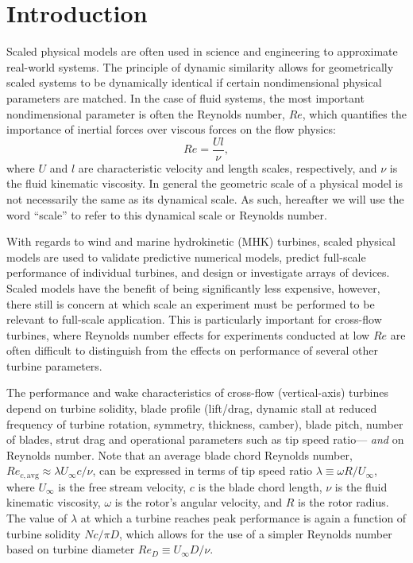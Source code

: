 \documentclass[energies,article,accept,moreauthors,pdftex,12pt,a4paper]{mdpi}
\begin{document}
\linenumbers


\section{Introduction}

Scaled physical models are often used in science and engineering to approximate
real-world systems. The principle of dynamic similarity allows for geometrically
scaled systems to be dynamically identical if certain nondimensional
physical parameters are matched. In the case of fluid systems, the most
important nondimensional parameter is often the Reynolds number, $Re$, which
quantifies the importance of inertial forces over viscous forces on the flow
physics:
\begin{equation}
    Re = \frac{Ul}{\nu},
    \label{eq:Re}
\end{equation}
where $U$ and $l$ are characteristic velocity and length scales, respectively,
and $\nu$ is the fluid kinematic viscosity. In general the geometric scale of a
physical model is not necessarily the same as its dynamical scale. As such,
hereafter we will use the word ``scale'' to refer to this dynamical scale or
Reynolds number.

With regards to wind and marine hydrokinetic (MHK) turbines, scaled physical
models are used to validate predictive numerical models, predict full-scale
performance of individual turbines, and design or investigate arrays of devices.
Scaled models have the benefit of being significantly less expensive, however,
there still is concern at which scale an experiment must be performed to be
relevant to full-scale application. This is particularly important for
cross-flow turbines, where Reynolds number effects for experiments conducted at
low $Re$ are often difficult to distinguish from the effects on performance of
several other turbine parameters.

The performance and wake characteristics of cross-flow (vertical-axis) turbines
depend on turbine solidity, blade profile (lift/drag, dynamic stall at reduced
frequency of turbine rotation, symmetry, thickness, camber), blade pitch, number
of blades, strut drag and operational parameters such as tip speed ratio---{\em
    and} on Reynolds number. Note that an average blade chord Reynolds number,
$Re_{c,\mathrm{avg}} \approx \lambda U_\infty c/ \nu$, can be expressed in terms
of tip speed ratio $\lambda \equiv \omega R/ U_\infty$, where $U_\infty$ is the
free stream velocity, $c$ is the blade chord length, $\nu$ is the fluid
kinematic viscosity, $\omega$ is the rotor's angular velocity, and $R$ is the
rotor radius. The value of $\lambda$ at which a turbine reaches peak performance
is again a function of turbine solidity $Nc/\pi D$, which allows for the use of
a simpler Reynolds number based on turbine diameter $Re_D \equiv U_\infty
D/\nu$. 
\end{document}

